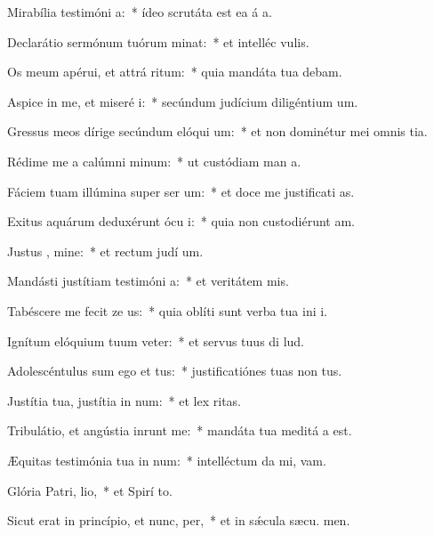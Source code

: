 \item Mirabília testimóni a:~* ídeo scrutáta est ea á a.
\item Declarátio sermónum tuórum minat:~* et intelléc  vulis.
\item Os meum apérui, et attrá ritum:~* quia mandáta tua debam.
\item Aspice in me, et miseré i:~* secúndum judícium diligéntium  um.
\item Gressus meos dírige secúndum elóqui um:~* et non dominétur mei omnis tia.
\item Rédime me a calúmni minum:~* ut custódiam man a.
\item Fáciem tuam illúmina super ser um:~* et doce me justificati as.
\item Exitus aquárum deduxérunt ócu i:~* quia non custodiérunt  am.
\item Justus , mine:~* et rectum judí um.
\item Mandásti justítiam testimóni a:~* et veritátem  mis.
\item Tabéscere me fecit ze us:~* quia oblíti sunt verba tua ini i.
\item Ignítum elóquium tuum veter:~* et servus tuus di lud.
\item Adolescéntulus sum ego et tus:~* justificatiónes tuas non  tus.
\item Justítia tua, justítia in num:~* et lex  ritas.
\item Tribulátio, et angústia inrunt me:~* mandáta tua meditá a est.
\item Æquitas testimónia tua in num:~* intelléctum da mi,  vam.
\item Glória Patri,  lio,~* et Spirí to.
\item Sicut erat in princípio, et nunc,  per,~* et in sǽcula sæcu. men.
